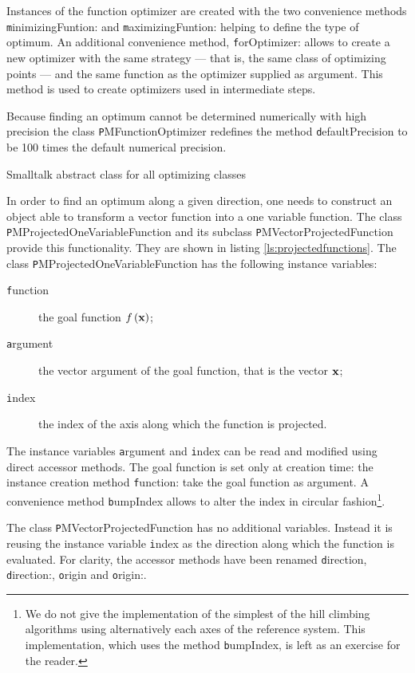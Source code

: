 Instances of the function optimizer are created with the two
convenience methods {\texttt minimizingFuntion:} and {\texttt
maximizingFuntion:} helping to define the type of optimum. An
additional convenience method, {\texttt forOptimizer:} allows to
create a new optimizer with the same strategy --- that is, the
same class of optimizing points --- and the same function as the
optimizer supplied as argument.
This method is used to create optimizers used in intermediate steps.

Because finding an optimum cannot be determined numerically with
high precision \cite{Press} the class {\texttt PMFunctionOptimizer}
redefines the method {\texttt defaultPrecision} to be 100 times the
default numerical precision.
\begin{listing} Smalltalk abstract class for all optimizing classes \label{ls:optimizerAbstract}

\end{listing}

In order to find an optimum along a given direction, one needs to
construct an object able to transform a vector function into a one
variable function. The class {\texttt PMProjectedOneVariableFunction}
and its subclass {\texttt PMVectorProjectedFunction} provide this
functionality. They are shown in listing
\ref{ls:projectedfunctions}. The class {\texttt
PMProjectedOneVariableFunction} has the following instance
variables:
\begin{description}
  \item[\texttt function] the goal function $f\left({\textbf x}\right)$;
  \item[\texttt argument] the vector argument of the goal function,
  that is the vector ${\textbf x}$;
  \item[\texttt index] the index of the axis along which the function
  is projected.
\end{description}
The instance variables {\texttt argument} and {\texttt index} can be read
and modified using direct accessor methods.
The goal function is set only at creation time: the instance creation method {\texttt
function:} take the goal function as argument.
A convenience method {\texttt bumpIndex} allows to alter the index in circular
fashion\footnote{We do not give the implementation of the simplest
of the hill climbing algorithms using alternatively each axes of
the reference system. This implementation, which uses the method
{\texttt bumpIndex}, is left as an exercise for the reader.}.

The class {\texttt PMVectorProjectedFunction} has no additional
variables. Instead it is reusing the instance variable {\texttt index}
as the direction along which the function is evaluated. For
clarity, the accessor methods have been renamed {\texttt direction},
{\texttt direction:}, {\texttt origin} and {\texttt origin:}.

